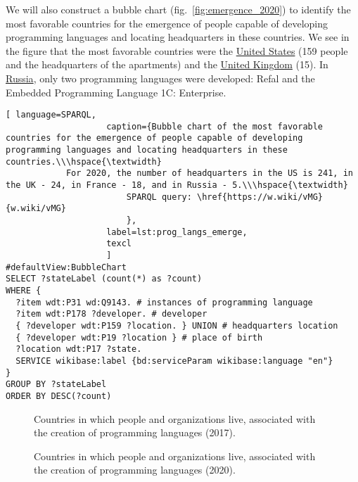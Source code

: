 We will also construct a bubble chart (fig.~\ref{fig:emergence_2020}) to identify the most favorable countries for the emergence of people capable of developing programming languages and locating headquarters in these countries. We see in the figure that the most favorable countries were the \href{https://en.wikipedia.org/wiki/United_States}{United States} (159 people and the headquarters of the apartments) and the \href{https://en.wikipedia.org/wiki/United_Kingdom}{United Kingdom} (15). In \href{https://en.wikipedia.org/wiki/Russia}{Russia}, only two programming languages were developed: Refal and the Embedded Programming Language 1C: Enterprise.

\begin{lstlisting}[ language=SPARQL, 
                    caption={Bubble chart of the most favorable countries for the emergence of people capable of developing programming languages and locating headquarters in these countries.\\\hspace{\textwidth}
			For 2020, the number of headquarters in the US is 241, in the UK - 24, in France - 18, and in Russia - 5.\\\hspace{\textwidth}
                        SPARQL query: \href{https://w.wiki/vMG}{w.wiki/vMG}
                        },
                    label=lst:prog_langs_emerge,
                    texcl 
                    ]
#defaultView:BubbleChart
SELECT ?stateLabel (count(*) as ?count)
WHERE {
  ?item wdt:P31 wd:Q9143. # instances of programming language
  ?item wdt:P178 ?developer. # developer
  { ?developer wdt:P159 ?location. } UNION # headquarters location
  { ?developer wdt:P19 ?location } # place of birth
  ?location wdt:P17 ?state.
  SERVICE wikibase:label {bd:serviceParam wikibase:language "en"} 	
}
GROUP BY ?stateLabel
ORDER BY DESC(?count)
\end{lstlisting}%

\begin{figure*}[h]
{
\setlength{\fboxsep}{0pt}%
\setlength{\fboxrule}{1pt}%
}
	\caption{Countries in which people and organizations live, associated with the creation of programming languages (2017).}
\end{figure*}
\begin{figure*}[h]
{
\setlength{\fboxsep}{0pt}%
\setlength{\fboxrule}{1pt}%
}
	\caption{Countries in which people and organizations live, associated with the creation of programming languages (2020).}
\end{figure*}


